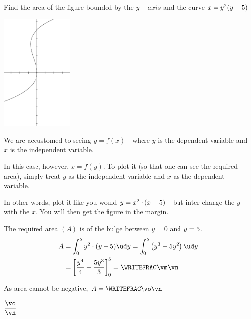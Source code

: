 

\POWER{}\vb
\FRACTIONSIMPLIFY{}\vm\vn
\ABSVALUE\vm\vo

\question[3] Find the area of the figure bounded by the $y-axis$ and the curve 
$x=y^2(y-5)$

\watchout

\ifprintanswers
  \begin{marginfigure}[30pt]
    \includegraphics[width=100pt]{graph.eps}
  \end{marginfigure}
\fi 

\begin{solution}[\halfpage]
  We are accustomed to seeing $y=f(x)$ - where $y$ is the dependent variable and 
  $x$ is the independent variable. 
  
  In this case, however, $x=f(y)$. To plot it (so that one can see the required area), 
  simply treat $y$ as the independent variable and $x$ as the dependent variable. 

  In other words, plot it like you would $y=x^2\cdot (x-5)$ - but inter-change 
  the $y$ with the $x$. You will then get the figure in the margin. 

  The required area $(A)$ is of the bulge between $y=0$ and $y=5$.
  \begin{align}
     A &= \int_0^{\va} y^2\cdot(y-\va)\ud y 
     = \int_0^{\va}\left(y^3-\va y^2\right)\ud y \\
       &= \left[ \dfrac{y^4}{4} - \dfrac{\va y^3}{3}\right]_0^{\va} = \WRITEFRAC\vm\vn
  \end{align}
  
  As area cannot be negative, $A=\WRITEFRAC\vo\vn$
\end{solution}

\ifprintanswers
  \begin{codex}
    $\dfrac\vo\vn$
  \end{codex}
\fi
